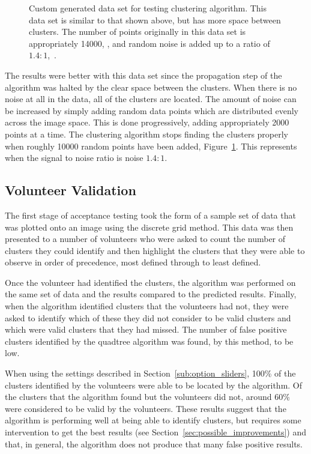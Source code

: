 \begin{figure}[tbhp]
\begin{subfigure}[b]{0.3\textwidth}
		\caption{}\label{fig:testing-image2b}
	\end{subfigure}
	\caption[Custom generated data set for testing clustering
		algorithm.]{Custom generated data set for testing clustering
		algorithm. This data set is similar to that shown above, but
		has more space between clusters. The number of points originally in
		this data set is appropriately \num{14000},
		, and random noise is added up to a ratio
		of $1.4:\!1$,~.}\label{fig:testing-image2a}
\end{figure}

The results were better with this data set since the propagation step of the
algorithm was halted by the clear space between the clusters. When there is no
noise at all in the data, all of the clusters are located. The amount of noise
can be increased by simply adding random data points which are distributed
evenly across the image space. This is done progressively, adding appropriately
\num{2000} points at a time. The clustering algorithm stops finding the
clusters properly when roughly \num{10000} random points have been added,
Figure~\ref{fig:testing-image2b}. This represents when the signal to noise
ratio is noise $1.4:\!1$.

\subsection{Volunteer Validation}
\label{sub:volunteer_validation}

The first stage of acceptance testing took the form of a sample set of data
that was plotted onto an image using the discrete grid method. This data was
then presented to a number of volunteers who were asked to count the number of
clusters they could identify and then highlight the clusters that they were
able to observe in order of precedence, most defined through to least defined.

Once the volunteer had identified the clusters, the algorithm was performed on
the same set of data and the results compared to the predicted results.
Finally, when the algorithm identified clusters that the volunteers had not,
they were asked to identify which of these they did not consider to be valid
clusters and which were valid clusters that they had missed. The number of
false positive clusters identified by the quadtree algorithm was found, by this
method, to be low.

When using the settings described in Section~\ref{sub:option_sliders}, 100\% of
the clusters identified by the volunteers were able to be located by the
algorithm. Of the clusters that the algorithm found but the volunteers did not,
around 60\% were considered to be valid by the volunteers. These results
suggest that the algorithm is performing well at being able to identify
clusters, but requires some intervention to get the best results (see
Section~\ref{sec:possible_improvements}) and that, in general, the algorithm
does not produce that many false positive results.

